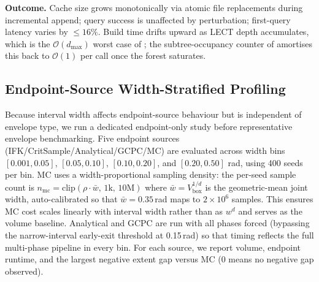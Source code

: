 \documentclass[journal]{IEEEtran}
\begin{document}
\begin{table}[ht]
\centering
\caption{S4 — 6 sequential cross-scene builds (same robot,
$\pm 1$\,cm obstacle perturbation).}
\label{tab:s4_lifelong}
\end{table}

\textbf{Outcome.} Cache size grows monotonically via atomic file
replacements during incremental append; query success is unaffected by
perturbation;
first-query latency varies by $\leq\!16\%$. Build time drifts upward
as LECT depth accumulates, which is the $\mathcal{O}(d_\text{max})$
worst case of ; the subtree-occupancy counter of
 amortises this back to $\mathcal{O}(1)$ per
call once the forest saturates.

\subsection{Endpoint-Source Width-Stratified Profiling}\label{sec:exp_ep_width}

Because interval width affects endpoint-source behaviour but is
independent of envelope type, we run a dedicated endpoint-only study
before representative envelope benchmarking. Five endpoint sources
(IFK/CritSample/Analytical/GCPC/MC) are evaluated across width bins
$[0.001,0.05]$, $[0.05,0.10]$, $[0.10,0.20]$, and
$[0.20,0.50]$ rad, using 400 seeds per bin.
MC uses a width-proportional sampling density: the per-seed sample count
is $n_{\mathrm{mc}}=\mathrm{clip}(\rho\cdot\bar{w},\,1\mathrm{k},\,10\mathrm{M})$
where $\bar{w}=V_{\mathrm{box}}^{1/d}$ is the geometric-mean joint width,
auto-calibrated so that $\bar{w}=0.35$\,rad maps to $2\times10^{6}$ samples.
This ensures MC cost scales linearly with interval width rather than
as $w^d$ and serves as the volume baseline.
Analytical and GCPC are run with all phases forced
(bypassing the narrow-interval early-exit threshold at 0.15\,rad)
so that timing reflects the full multi-phase pipeline in every bin.
For each source, we report volume,
endpoint runtime, and the largest negative extent gap versus MC
(0 means no negative gap observed).
\end{document}
